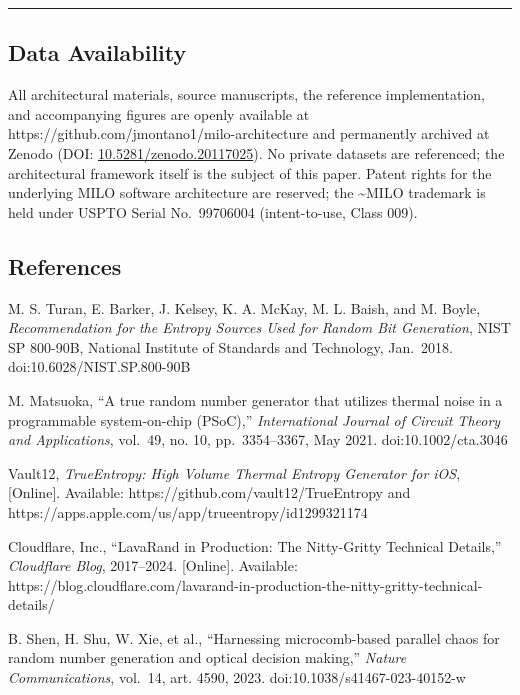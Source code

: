 \begin{center}\rule{0.5\linewidth}{0.5pt}\end{center}

\subsection{Data Availability}\label{data-availability}

All architectural materials, source manuscripts, the reference
implementation, and accompanying figures are openly available at
https://github.com/jmontano1/milo-architecture and permanently archived
at Zenodo (DOI:
\href{https://doi.org/10.5281/zenodo.20117025}{10.5281/zenodo.20117025}).
No private datasets are referenced; the architectural framework itself
is the subject of this paper. Patent rights for the underlying MILO
software architecture are reserved; the \textasciitilde MILO trademark
is held under USPTO Serial No.~99706004 (intent-to-use, Class 009).

\subsection{References}\label{references}

\cite{ref1} M. S. Turan, E. Barker, J. Kelsey, K. A. McKay, M. L. Baish, and
M. Boyle, \emph{Recommendation for the Entropy Sources Used for Random
Bit Generation}, NIST SP 800-90B, National Institute of Standards and
Technology, Jan.~2018. doi:10.6028/NIST.SP.800-90B

\cite{ref2} M. Matsuoka, ``A true random number generator that utilizes
thermal noise in a programmable system-on-chip (PSoC),''
\emph{International Journal of Circuit Theory and Applications},
vol.~49, no. 10, pp.~3354--3367, May 2021. doi:10.1002/cta.3046

\cite{ref3} Vault12, \emph{TrueEntropy: High Volume Thermal Entropy
Generator for iOS}, {[}Online{]}. Available:
https://github.com/vault12/TrueEntropy and
https://apps.apple.com/us/app/trueentropy/id1299321174

\cite{ref4} Cloudflare, Inc., ``LavaRand in Production: The Nitty-Gritty
Technical Details,'' \emph{Cloudflare Blog}, 2017--2024. {[}Online{]}.
Available:
https://blog.cloudflare.com/lavarand-in-production-the-nitty-gritty-technical-details/

\cite{ref5} B. Shen, H. Shu, W. Xie, et al., ``Harnessing microcomb-based
parallel chaos for random number generation and optical decision
making,'' \emph{Nature Communications}, vol.~14, art. 4590, 2023.
doi:10.1038/s41467-023-40152-w

